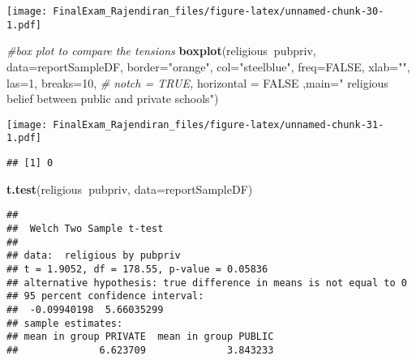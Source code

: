 \documentclass[]{article}
\newenvironment{Shaded}{\begin{snugshade}}{\end{snugshade}}
\newcommand{\CommentTok}[1]{\textcolor[rgb]{0.56,0.35,0.01}{\textit{#1}}}
\newcommand{\DataTypeTok}[1]{\textcolor[rgb]{0.13,0.29,0.53}{#1}}
\newcommand{\DecValTok}[1]{\textcolor[rgb]{0.00,0.00,0.81}{#1}}
\newcommand{\KeywordTok}[1]{\textcolor[rgb]{0.13,0.29,0.53}{\textbf{#1}}}
\newcommand{\NormalTok}[1]{#1}
\newcommand{\OperatorTok}[1]{\textcolor[rgb]{0.81,0.36,0.00}{\textbf{#1}}}
\newcommand{\OtherTok}[1]{\textcolor[rgb]{0.56,0.35,0.01}{#1}}
\newcommand{\StringTok}[1]{\textcolor[rgb]{0.31,0.60,0.02}{#1}}
\begin{document}
\texttt{[image: FinalExam\_Rajendiran\_files/figure-latex/unnamed-chunk-30-1.pdf]}

\begin{Shaded}
\begin{Highlighting}[]
\CommentTok{#box plot to compare the tensions}
\KeywordTok{boxplot}\NormalTok{(religious}\OperatorTok{~}\NormalTok{pubpriv, }\DataTypeTok{data=}\NormalTok{reportSampleDF,}
       \DataTypeTok{border=}\StringTok{"orange"}\NormalTok{, }
       \DataTypeTok{col=}\StringTok{"steelblue"}\NormalTok{,}
       \DataTypeTok{freq=}\OtherTok{FALSE}\NormalTok{,}
       \DataTypeTok{xlab=}\StringTok{""}\NormalTok{,}
       \DataTypeTok{las=}\DecValTok{1}\NormalTok{, }
       \DataTypeTok{breaks=}\DecValTok{10}\NormalTok{,}
       \CommentTok{# notch = TRUE,}
       \DataTypeTok{horizontal =} \OtherTok{FALSE}\NormalTok{ ,}\DataTypeTok{main=}\StringTok{" religious belief between public and private schools"}\NormalTok{)}
\end{Highlighting}
\end{Shaded}

\texttt{[image: FinalExam\_Rajendiran\_files/figure-latex/unnamed-chunk-31-1.pdf]}

\begin{Shaded}
\end{Shaded}

\begin{verbatim}
## [1] 0
\end{verbatim}

\begin{Shaded}
\begin{Highlighting}[]
\KeywordTok{t.test}\NormalTok{(religious}\OperatorTok{~}\NormalTok{pubpriv, }\DataTypeTok{data=}\NormalTok{reportSampleDF)}
\end{Highlighting}
\end{Shaded}

\begin{verbatim}
## 
##  Welch Two Sample t-test
## 
## data:  religious by pubpriv
## t = 1.9052, df = 178.55, p-value = 0.05836
## alternative hypothesis: true difference in means is not equal to 0
## 95 percent confidence interval:
##  -0.09940198  5.66035299
## sample estimates:
## mean in group PRIVATE  mean in group PUBLIC 
##              6.623709              3.843233
\end{verbatim}
\end{document}
